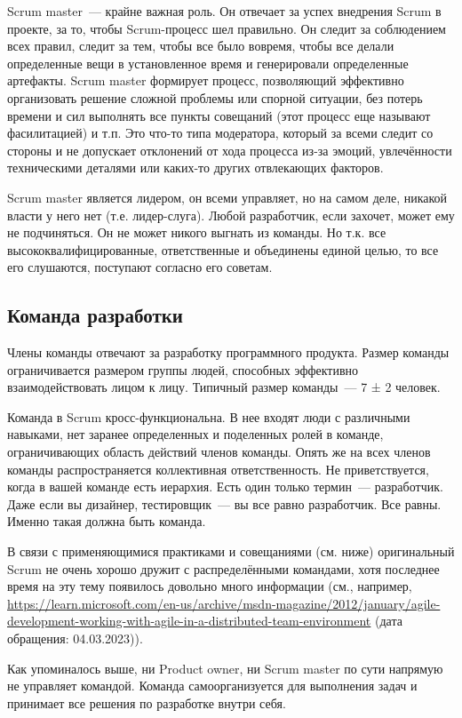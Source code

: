 \documentclass{../../text-style}
\begin{document}
Scrum master~--- крайне важная роль. Он отвечает за успех внедрения Scrum в проекте, за то, чтобы Scrum-процесс шел правильно. Он следит за соблюдением всех правил, следит за тем, чтобы все было вовремя, чтобы все делали определенные вещи в установленное время и генерировали определенные артефакты. Scrum master формирует процесс, позволяющий эффективно организовать решение сложной проблемы или спорной ситуации, без потерь времени и сил выполнять все пункты совещаний (этот процесс еще называют фасилитацией) и т.п. Это что-то типа модератора, который за всеми следит со стороны и не допускает отклонений от хода процесса из-за эмоций, увлечённости техническими деталями или каких-то других отвлекающих факторов.

Scrum master является лидером, он всеми управляет, но на самом деле, никакой власти у него нет (т.е. лидер-слуга). Любой разработчик, если захочет, может ему не подчиняться. Он не может никого выгнать из команды. Но т.к. все высококвалифицированные, ответственные и объединены единой целью, то все его слушаются, поступают согласно его советам.

\subsection{Команда разработки}

Члены команды отвечают за разработку программного продукта. Размер команды ограничивается размером группы людей, способных эффективно взаимодействовать лицом к лицу. Типичный размер команды~--- 7 ± 2 человек.

Команда в Scrum кросс-функциональна. В нее входят люди с различными навыками, нет заранее определенных и поделенных ролей в команде, ограничивающих область действий членов команды. Опять же на всех членов команды распространяется коллективная ответственность. Не приветствуется, когда в вашей команде есть иерархия. Есть один только термин~--- разработчик. Даже если вы дизайнер, тестировщик~--- вы все равно разработчик. Все равны. Именно такая должна быть команда.

В связи с применяющимися практиками и совещаниями (см. ниже) оригинальный Scrum не очень хорошо дружит с распределёнными командами, хотя последнее время на эту тему появилось довольно много информации (см., например, \url{https://learn.microsoft.com/en-us/archive/msdn-magazine/2012/january/agile-development-working-with-agile-in-a-distributed-team-environment} (дата обращения: 04.03.2023)).

Как упоминалось выше, ни Product owner, ни Scrum master по сути напрямую не управляет командой. Команда самоорганизуется для выполнения задач и принимает все решения по разработке внутри себя.
\end{document}
